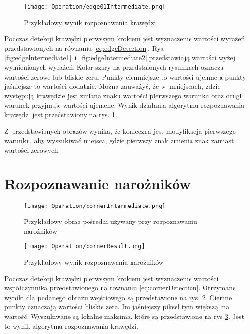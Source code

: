 \begin{figure}[h]
\begin{center}
\texttt{[image: Operation/edge01Intermediate.png]}
\end{center}
\caption{Przykładowy wynik rozpoznawania krawędzi}
\label{fig:edgeResult}
\end{figure}

Podczas detekcji krawędzi pierwszym krokiem jest wyznaczenie wartości wyrażeń przedstawionych na równaniu \ref{eq:edgeDetection}. Rys. \ref{fig:edgeIntermediate1}~i~\ref{fig:edgeIntermediate2} przedstawiają wartości wyżej wymienionych wyrażeń. Kolor szary na przedstaionych rysunkach oznacza wartości zerowe lub bliskie zeru. Punkty ciemniejsze to wartości ujemne a punkty jaśniejsze to wartości dodatnie. Można zauważyć, że w~mniejscach, gdzie występują krawędzie jest zmiana znaku wartości pierwszego warunku oraz drugi warunek przyjmuje wartości ujemene. Wynik działania algorytmu rozpoznawania krawędzi jest przedstawiony na rys. \ref{fig:edgeResult}.

Z~przedstawionych obrazów wynika, że konieczna jest modyfikacja pierwszego warunku, aby wyszukiwać miejsca, gdzie pierwszy znak zmienia znak zamiast wartości zerowych.

\section{Rozpoznawanie narożników}
\label{sec:dzialanieCorner}

\begin{figure}[h]
\begin{center}
\texttt{[image: Operation/cornerIntermediate.png]}
\end{center}
\caption{Przykładowy obraz pośredni używany przy rozpoznawaniu narożników}
\label{fig:cornerIntermediate}
\end{figure}

\begin{figure}[h]
\begin{center}
\texttt{[image: Operation/cornerResult.png]}
\end{center}
\caption{Przykładowy wynik rozpoznawania narożników}
\label{fig:cornerResult}
\end{figure}

Podczas detekcji krawędzi pierwszym krokiem jest wyznaczenie wartości współczynnika przedstawionego na równaniu \ref{eq:cornerDetection}. Otrzymane wyniki dla podanego obrazu wejściowego są przedstawione na rys. \ref{fig:cornerIntermediate}. Ciemne punkty oznaczają wartości bliskie zera. Im jaśniejszy piksel tym większą ma wartość. Wyszukiwane są lokalne maksima, które są przedstawione na rys \ref{fig:cornerResult}. Jest to wynik algorytmu rozpoznawania krawędzi.

